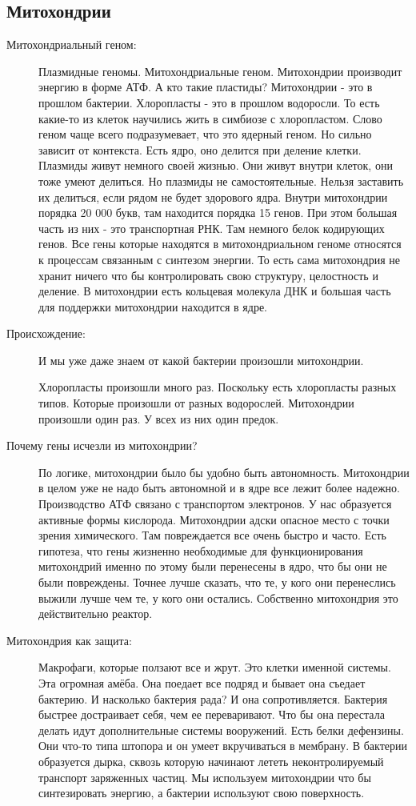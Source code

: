 \subsection{Митохондрии}
\begin{description}
\item[Митохондриальный геном:]
Плазмидные геномы. Митохондриальные геном.
Митохондрии производит энергию в форме АТФ. А кто
такие пластиды? Митохондрии - это в прошлом бактерии.
Хлоропласты - это в прошлом водоросли. То есть
какие-то из клеток научились жить в симбиозе с
хлоропластом. Слово геном чаще всего подразумевает, что
это ядерный геном. Но сильно зависит от контекста.
Есть ядро, оно делится при деление клетки. Плазмиды живут 
немного своей жизнью. Они живут внутри клеток, они тоже 
умеют делиться. Но плазмиды не самостоятельные. Нельзя 
заставить их делиться, если рядом не будет здорового ядра. 
Внутри митохондрии порядка 20 000 букв, там 
находится порядка 15 генов. При этом большая часть из 
них - это транспортная РНК. Там немного белок кодирующих генов. 
Все гены которые находятся в митохондриальном геноме 
относятся к процессам связанным с синтезом энергии. 
То есть сама митохондрия не хранит ничего что бы контролировать 
свою структуру, целостность и деление. 
В митохондрии есть кольцевая молекула ДНК и большая часть для поддержки 
митохондрии находится в ядре.

\item[Происхождение:]
И мы уже даже знаем от какой бактерии произошли митохондрии. 

Хлоропласты произошли много раз. Поскольку есть хлоропласты разных типов. 
Которые произошли от разных водорослей. Митохондрии произошли один раз. У всех из 
них один предок. 

\item[Почему гены исчезли из митохондрии?]
По логике, митохондрии было бы удобно быть автономность. Митохондрии 
в целом уже не надо быть автономной и в ядре все лежит более надежно. 
Производство АТФ связано с транспортом электронов. У нас 
образуется активные формы кислорода. Митохондрии
адски опасное место с точки зрения химического. Там 
повреждается все очень быстро и часто. Есть гипотеза, что 
гены жизненно необходимые для функционирования митохондрий именно 
по этому были перенесены в ядро, что бы они не были 
повреждены. Точнее лучше сказать, что те, 
у кого они перенеслись выжили лучше чем те, 
у кого они остались. Собственно митохондрия это действительно 
реактор. 

\item[Митохондрия как защита:]
Макрофаги, которые ползают все и жрут. Это 
клетки именной системы. Эта огромная амёба. Она
поедает все подряд и бывает 
она съедает бактерию. И насколько бактерия рада? 
И она сопротивляется. Бактерия быстрее достраивает себя, 
чем ее переваривают. Что бы она перестала делать идут 
дополнительные системы вооружений. Есть белки 
дефензины. Они что-то типа штопора и он 
умеет вкручиваться в мембрану. В бактерии 
образуется дырка, 
сквозь которую начинают лететь неконтролируемый транспорт 
заряженных частиц. Мы используем митохондрии что бы синтезировать 
энергию, а бактерии используют свою поверхность. 


\end{description}
